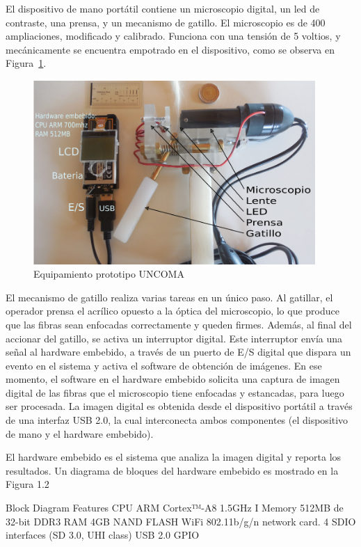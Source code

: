 \documentclass[runningheads,a4paper]{llncs}
\begin{document}
El dispositivo de mano portátil contiene un microscopio digital, un led de contraste, una prensa, y un mecanismo de gatillo.
El microscopio es de 400 ampliaciones, modificado y calibrado. Funciona con una tensión de 5 voltios, y mecánicamente se encuentra empotrado en el dispositivo, como se observa en Figura~\ref{fig:prototipo4}.
\begin{figure}
\centering
\includegraphics[height=7cm]{prototipo4}
\caption{Equipamiento prototipo UNCOMA}
\label{fig:prototipo4}
\end{figure}

El mecanismo de gatillo realiza varias tareas en un único paso. Al gatillar, el operador prensa el acrílico opuesto a la óptica del microscopio, lo que produce que las fibras sean enfocadas correctamente y queden firmes. Además, al final del accionar del gatillo, se activa un interruptor digital. Este interruptor envía una señal al hardware embebido, a través de un puerto de E/S digital que dispara un evento en el sistema y activa el software de obtención de imágenes.
En ese momento, el software en el hardware embebido solicita una captura de imagen digital de las fibras que el microscopio tiene enfocadas y estancadas, para luego ser procesada. La imagen digital es obtenida desde el dispositivo portátil a través de una interfaz USB 2.0, la cual interconecta ambos componentes (el dispositivo de mano y el hardware embebido).

El hardware embebido es el sistema 
que analiza la imagen digital y reporta los resultados.
Un diagrama de bloques del hardware embebido es mostrado en la Figura 1.2



Block Diagram
Features
CPU ARM Cortex™-A8 1.5GHz I
Memory 512MB de 32-bit DDR3 RAM
4GB NAND FLASH
WiFi 802.11b/g/n network card. 
4 SDIO interfaces (SD 3.0, UHI class)
USB 2.0
GPIO
\end{document}
